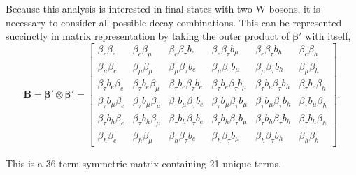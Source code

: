 \noindent
Because this analysis is interested in final states with two W bosons,
it is necessary to consider all possible decay combinations.  This can
be represented succinctly in matrix representation by taking the
outer product of $\boldsymbol{\beta'}$ with itself,
% 
\begin{equation}
\label{eq:br_matrix}
    \mathbf{B} =  \boldsymbol{\beta'}\otimes \boldsymbol{\beta'} =
    \begin{bmatrix}
        \beta_e \beta_e     & \beta_e \beta_\mu     & \beta_e \beta_\tau b_{e}     & \beta_e \beta_\tau b_{\mu}   & \beta_e \beta_\tau b_{h}     & \beta_e \beta_h   \\
        \beta_\mu \beta_e   & \beta_\mu \beta_\mu   & \beta_\mu \beta_\tau b_{e}   & \beta_\mu \beta_\tau b_{\mu} & \beta_\mu \beta_\tau b_{h}   & \beta_\mu \beta_h \\
        \beta_\tau b_{e} \beta_e       & \beta_\tau b_{e} \beta_\mu       & \beta_\tau b_{e} \beta_\tau b_{e}       & \beta_\tau b_{e} \beta_\tau b_{\mu}     & \beta_\tau b_{e} \beta_\tau b_{h}       & \beta_\tau b_{e} \beta_h     \\
        \beta_\tau b_{\mu} \beta_e     & \beta_\tau b_{\mu}\beta_\mu      & \beta_\tau b_{\mu} \beta_\tau b_{e}     & \beta_\tau b_{\mu} \beta_\tau b_{\mu}   & \beta_\tau b_{\mu} \beta_\tau b_{h}     & \beta_\tau b_{\mu} \beta_h   \\
        \beta_\tau b_{h} \beta_e       & \beta_\tau b_{h} \beta_\mu       & \beta_\tau b_{h} \beta_\tau b_{e}       & \beta_\tau b_{h}  \beta_\tau b_{\mu}    & \beta_\tau b_{h} \beta_\tau b_{h}       & \beta_\tau b_{h} \beta_h     \\
        \beta_h \beta_e     & \beta_h \beta_\mu     & \beta_h \beta_\tau b_{e}     & \beta_h \beta_\tau b_{\mu}   & \beta_h  \beta_\tau b_{h}    & \beta_h  \beta_h 
	\end{bmatrix}
    . 
\end{equation}


\noindent This is a 36 term symmetric matrix containing 21 unique terms.



